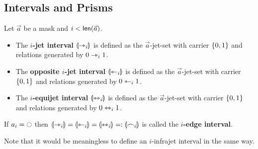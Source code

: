 \documentclass[a4paper]{memoir}
\begin{document}
\subsection{Intervals and Prisms}
\begin{definition} \label{def:interval}
	Let $\vec a$ be a mask and $i < \mathsf{len}(\vec a)$.
	\begin{itemize}
		\item The \textbf{$i$-jet interval} ${\llparenthesis \rightarrowtriangle_i \rrparenthesis}$ is defined as the $\vec a$-jet-set with carrier $\mathopen{}\left\{ 0, 1 \right\}\mathclose{}$ and relations generated by $0 \rightarrowtriangle_i 1$.
		\item The \textbf{opposite $i$-jet interval} ${\llparenthesis \leftarrowtriangle_i \rrparenthesis}$ is defined as the $\vec a$-jet-set with carrier $\mathopen{}\left\{ 0, 1 \right\}\mathclose{}$ and relations generated by $0 \leftarrowtriangle_i 1$.
		\item The \textbf{$i$-equijet interval} ${\llparenthesis \leftrightarrowtriangle_i \rrparenthesis}$ is defined as the $\vec a$-jet-set with carrier $\mathopen{}\left\{ 0, 1 \right\}\mathclose{}$ and relations generated by $0 \leftrightarrowtriangle_i 1$.
	\end{itemize}
	If $a_i = \npolar$ then ${\llparenthesis \rightarrowtriangle_i \rrparenthesis} = {\llparenthesis \leftarrowtriangle_i \rrparenthesis} = {\llparenthesis \leftrightarrowtriangle_i \rrparenthesis} =: {\llparenthesis \frown_i \rrparenthesis}$ is called the \textbf{$i$-edge interval}.
\end{definition}
Note that it would be meaningless to define an $i$-infrajet interval in the same way.
\end{document}
